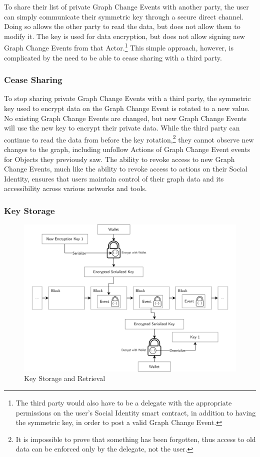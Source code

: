 \documentclass[12pt,letterpaper]{article}
\begin{document}
To share their list of private Graph Change Events with another party, the user can simply
communicate their symmetric key through a secure direct channel. Doing so allows the other
party to read the data, but does not allow them to modify it. The key is used for data
encryption, but does not allow signing new Graph Change Events from that
Actor.\footnote{The third party would also have to be a delegate with the appropriate
	permissions on the user’s Social Identity smart contract, in addition to having the
	symmetric key, in order to post a valid Graph Change Event.} This simple approach,
however, is complicated by the need to be able to cease sharing with a third party.

\subsubsection{Cease Sharing}

To stop sharing private Graph Change Events with a third party, the symmetric key used to
encrypt data on the Graph Change Event is rotated to a new value. No existing Graph Change
Events are changed, but new Graph Change Events will use the new key to encrypt their
private data. While the third party can continue to read the data from before the key
rotation,\footnote{It is impossible to prove that something has been forgotten, thus
	access to old data can be enforced only by the delegate, not the user.} they cannot
observe new changes to the graph, including unfollow Actions of Graph Change Event events
for Objects they previously saw. The ability to revoke access to new Graph Change Events,
much like the ability to revoke access to actions on their Social Identity, ensures that
users maintain control of their graph data and its accessibility across various networks
and tools.

\subsubsection{Key Storage}

\begin{figure}
	\includegraphics[width=\linewidth]{figures/Key Storage and Retrieval.png}
	\caption{Key Storage and Retrieval}
	\label{fig:4}
\end{figure}
\end{document}
